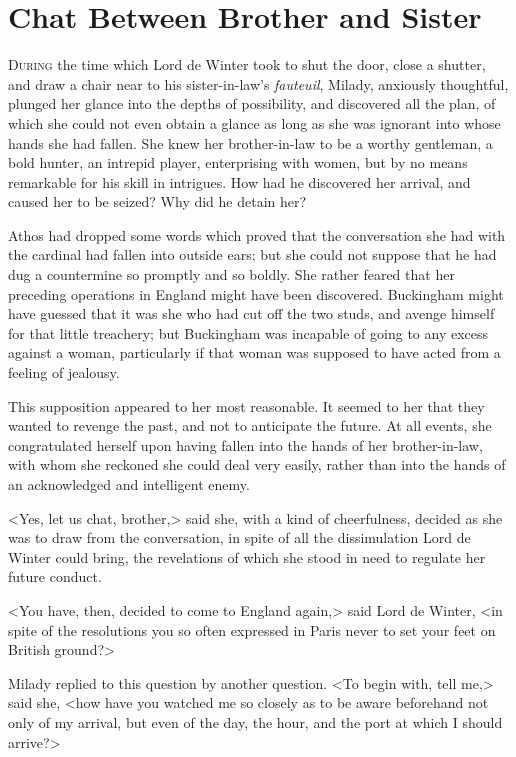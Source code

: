 
\chapter{Chat Between Brother and Sister}

\lettrine[]{D}{uring} the time which Lord de Winter took to shut the door, close a shutter, and draw a chair near to his sister-in-law's \textit{fauteuil}, Milady, anxiously thoughtful, plunged her glance into the depths of possibility, and discovered all the plan, of which she could not even obtain a glance as long as she was ignorant into whose hands she had fallen. She knew her brother-in-law to be a worthy gentleman, a bold hunter, an intrepid player, enterprising with women, but by no means remarkable for his skill in intrigues. How had he discovered her arrival, and caused her to be seized? Why did he detain her? 

Athos had dropped some words which proved that the conversation she had with the cardinal had fallen into outside ears; but she could not suppose that he had dug a countermine so promptly and so boldly. She rather feared that her preceding operations in England might have been discovered. Buckingham might have guessed that it was she who had cut off the two studs, and avenge himself for that little treachery; but Buckingham was incapable of going to any excess against a woman, particularly if that woman was supposed to have acted from a feeling of jealousy. 

This supposition appeared to her most reasonable. It seemed to her that they wanted to revenge the past, and not to anticipate the future. At all events, she congratulated herself upon having fallen into the hands of her brother-in-law, with whom she reckoned she could deal very easily, rather than into the hands of an acknowledged and intelligent enemy. 

<Yes, let us chat, brother,> said she, with a kind of cheerfulness, decided as she was to draw from the conversation, in spite of all the dissimulation Lord de Winter could bring, the revelations of which she stood in need to regulate her future conduct. 

<You have, then, decided to come to England again,> said Lord de Winter, <in spite of the resolutions you so often expressed in Paris never to set your feet on British ground?> 

Milady replied to this question by another question. <To begin with, tell me,> said she, <how have you watched me so closely as to be aware beforehand not only of my arrival, but even of the day, the hour, and the port at which I should arrive?> 

